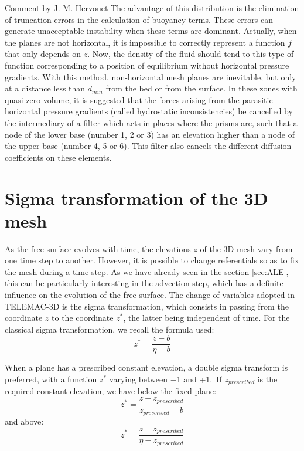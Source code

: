 \begin{CommentBlock}{Comment by J.-M. Hervouet}
The advantage of this distribution is the elimination of truncation errors in
the calculation of buoyancy terms. These errors can generate unacceptable
instability when these terms are dominant. Actually, when the planes are not
horizontal, it is impossible to correctly represent a function $f$ that only
depends on $z$. Now, the density of the fluid should tend to this type of
function corresponding to a position of equilibrium without horizontal
pressure gradients.
With this method, non-horizontal mesh planes are inevitable, but only at a
distance less than $d_{min}$ from the bed or from the surface. In these
zones with quasi-zero volume, it is suggested that the forces arising from the
parasitic horizontal pressure gradients (called hydrostatic inconsistencies)
be cancelled by the intermediary of a filter which acts in places where the
prisms are, such that a node of the lower base (number 1, 2 or 3) has an
elevation higher than a node of the upper base (number 4, 5 or 6). This filter
also cancels the different diffusion coefficients on these elements.
\end{CommentBlock}

\section{\label{transformation sigma}Sigma transformation of the 3D mesh}

As the free surface evolves with time, the elevations $z$ of the 3D mesh vary
from one time step to another. However,
it is possible to change referentials so as to fix the mesh
during a time step. As we have already seen in the section \ref{sec:ALE}, this can
be particularly interesting in the advection step, which has a definite
influence on the evolution of the free surface. The change of variables
adopted in TELEMAC-3D is the sigma transformation, which consists in passing from the
coordinate $z$ to the coordinate $z^{\ast}$, the latter being independent of time.
For the classical sigma transformation, we recall the formula used:%
\begin{equation}
z^{\ast}=\dfrac{z-b}{\eta-b}%
\end{equation}

When a plane has a prescribed constant elevation, a double sigma transform is
preferred, with a function $z^{\ast}$ varying between $-$1 and +1.\ If
$z_{prescribed}$ is the required constant elevation, we have below the fixed plane:
\begin{equation}
z^{\ast}=\dfrac{z-z_{prescribed}}{z_{prescribed}-b}%
\end{equation}
and above:%
\begin{equation}
z^{\ast}=\dfrac{z-z_{prescribed}}{\eta-z_{prescribed}}%
\end{equation}

